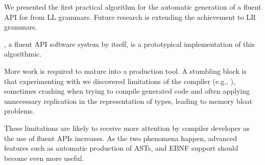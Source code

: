 We presented the first practical algorithm for the automatic generation of a
fluent API for \Java from LL grammars.  Future research is extending the
achievement to LR grammars. 

\Fajita, a fluent API software system by itself, is a prototypical
implementation of this algorithmic. 

More work is required to mature \Fajita into a production tool. A stumbling
block is that experimenting with \Fajita we discovered limitations of the \Java
compiler (e.g., ), sometimes crashing when trying to compile
\Fajita generated code and often applying unnecessary replication in the
representation of types, leading to memory bloat problems.

These limitations are likely to receive more attention by compiler developer as
the use of fluent APIs increases. As the two phenomena happen, advanced
features such as automatic production of ASTs, and EBNF support should become
even more useful.
